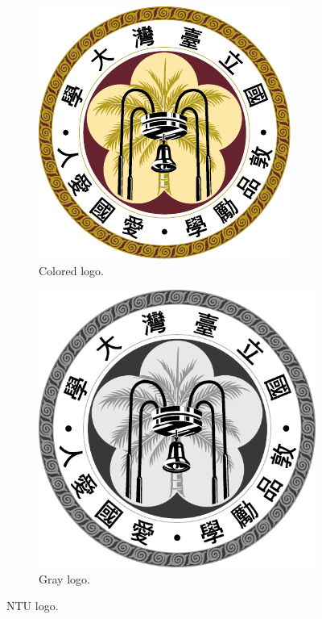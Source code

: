 \begin{figure}[ht]
\centering
    \begin{subfigure}[b]{0.3\textwidth}
        \includegraphics[width=\textwidth]{figures/NTU_logo_color.pdf}
        \caption{Colored logo.}
    \end{subfigure}
    \hspace{0.2\textwidth}
    \begin{subfigure}[b]{0.3\textwidth}
        \includegraphics[width=\textwidth]{figures/NTU_logo_gray.pdf}
        \caption{Gray logo.}
    \end{subfigure}
\caption{NTU logo.}
\label{fig:NTUlogo}
\end{figure}

